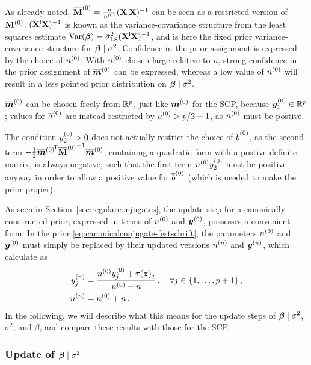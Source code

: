 As already noted, $\overline{\mathbf{M}}^{(0)} = \frac{n}{n^{(0)}}(\mathbf{X}^{{\mbox{\!\scriptsize\textsf{T}}}} \! \mathbf{X})^{-1}$ can be seen as a restricted version of $\mathbf{M}^{(0)}$.
$(\mathbf{X}^{{\mbox{\!\scriptsize\textsf{T}}}} \! \mathbf{X})^{-1}$ is known as the variance-covariance structure from the least squares estimate $\operatorname{Var}(\boldsymbol{\beta}) = \hat{\sigma}^2_\text{LS}(\mathbf{X}^{{\mbox{\!\scriptsize\textsf{T}}}} \! \mathbf{X})^{-1}$,
and is here the fixed prior variance-covariance structure for $\boldsymbol{\beta}\mid\sigma^2$.
Confidence in the prior assignment is expressed by the choice of $n^{(0)}$:
With $n^{(0)}$ chosen large relative to $n$, strong confidence in the prior assignment
of $\overline{{\bm m}}^{(0)}$ can be expressed, whereas a low value of $n^{(0)}$ will result in a less pointed
prior distribution on $\boldsymbol{\beta}\mid\sigma^2$.

$\overline{{\bm m}}^{(0)}$ can be chosen freely from $\mathbb{R}^p$, just like ${\bm m}^{(0)}$ for the SCP,
because ${\bm y}^{(0)}_1 \in \mathbb{R}^p$;
values for $\overline{a}^{(0)}$ are instead restricted by $\overline{a}^{(0)} > p/2 + 1$, as $n^{(0)}$ must be postive.

The condition $y^{(0)}_2 > 0$ does not actually restrict the choice of $\overline{b}^{(0)}$,
as the second term $-\frac{1}{2} {\overline{{\bm m}}^{(0)}}^{{\mbox{\!\scriptsize\textsf{T}}}} {\overline{\mathbf{M}}^{(0)}}^{-1} \overline{{\bm m}}^{(0)}$,
containing a quadratic form with a postive definite matrix,
is always negative, such that the first term $n^{(0)}y^{(0)}_2$ must be positive anyway
in order to allow a positive value for $\overline{b}^{(0)}$ (which is needed to make the prior proper).

As seen in Section~\ref{sec:regularconjugates},
the update step for a canonically constructed prior, expressed in terms of $n^{(0)}$ and ${\bm y}^{(0)}$,
possesses a convenient form: In the prior \eqref{eq:canonicalconjugate-festschrift},
the parameters $n^{(0)}$ and ${\bm y}^{(0)}$ must simply be replaced
by their updated versions $n^{(n)}$ and ${\bm y}^{(n)}$, which calculate as
\begin{align*}
y^{(n)}_j &= \frac{n^{(0)} y^{(0)}_j + \tau({\bm z})_j}{n^{(0)} + n}\,, \quad \forall j \in \{1, \ldots, p+1\}\,, \\
n^{(n)}   &= n^{(0)} + n \,.
\end{align*}
In the following, we will describe what this means for the update steps of
$\boldsymbol{\beta}\mid\sigma^2$, $\sigma^2$, and $\beta$, and compare these results
with those for the SCP. %


\subsubsection{Update of \texorpdfstring{$\boldsymbol{\beta}\mid\sigma^2$}{beta|sigma2}}
\label{sec:cccp-update1}

